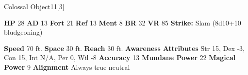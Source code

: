   

  \begin{monsubsection}{Colossal Object}{11}[3]
    \vspace{-1em}\vspace{-1em}
    \vspace{0em}

    
    

    \begin{spellcontent}
      \begin{spelltargetinginfo}
        \pari \textbf{HP} 28 \monsep
          \textbf{AD} 13 \monsep
          \textbf{Fort} 21 \monsep
          \textbf{Ref} 13 \monsep
          \textbf{Ment} 8
        \pari \textbf{BR} 32 \monsep
        \textbf{VR} 85
        \pari \textbf{Strike:}
            Slam  (8d10+10 bludgeoning)
      \end{spelltargetinginfo}
    \end{spellcontent}
    \begin{monsterfooter}
      \pari \textbf{Speed} 70 ft. \monsep
        \textbf{Space} 30 ft. \monsep
        \textbf{Reach} 30 ft.
      \pari \textbf{Awareness} 
      \pari \textbf{Attributes}
        Str 15, Dex -3,
        Con 15, Int N/A,
        Per 0, Wil -8
      \pari \textbf{Accuracy} 13 \monsep
        \textbf{Mundane Power} 22 \monsep
      \textbf{Magical Power} 9
      \pari \textbf{Alignment} Always true neutral
    \end{monsterfooter}
  \end{monsubsection}
  
  
  
